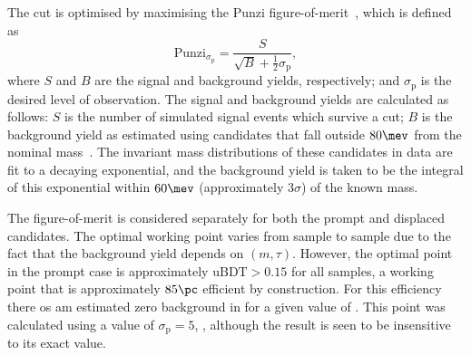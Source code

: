 
%

The \uBDT cut is optimised  by maximising
the Punzi figure-of-merit~\cite{2003sppp.conf...79P}, which is defined as
\begin{equation}
  \mathrm{Punzi}_{\sigma_\mathrm{p}} = \frac{S}{\sqrt{B} + \tfrac12\sigma_\mathrm{p}},
  \label{eq:db:punzi}
\end{equation}
where $S$ and $B$ are the signal and background yields, respectively; and $\sigma_\mathrm{p}$ is the desired
level of observation.
The signal and background yields are calculated as follows:
$S$ is the number of simulated signal events which survive a \uBDT cut;
$B$ is the background yield as estimated using \btokstrdb candidates
that fall outside $80\mev$ from the nominal \Bd mass~\cite{PDG2014}.
The invariant mass distributions of these candidates in data are fit to a decaying exponential,
and the background yield is taken to be the integral of this exponential within $60\mev$
(approximately $3\sigma$) of the known \Bd mass.

The figure-of-merit is considered separately for both the prompt and displaced candidates.
The optimal working point varies from sample to sample due to the fact that the background yield
depends on $(m,\tau)$.
However, the optimal point in the prompt case is approximately $\mathrm{uBDT}>0.15$ for all samples, a
working point that
is approximately $85\pc$ efficient by construction.
For this efficiency there os am estimated zero background in for a given value of \mass{\db}.
This point was calculated using a value of $\sigma_\mathrm{p}=5$, , although the
result is seen to be insensitive to its exact value.



